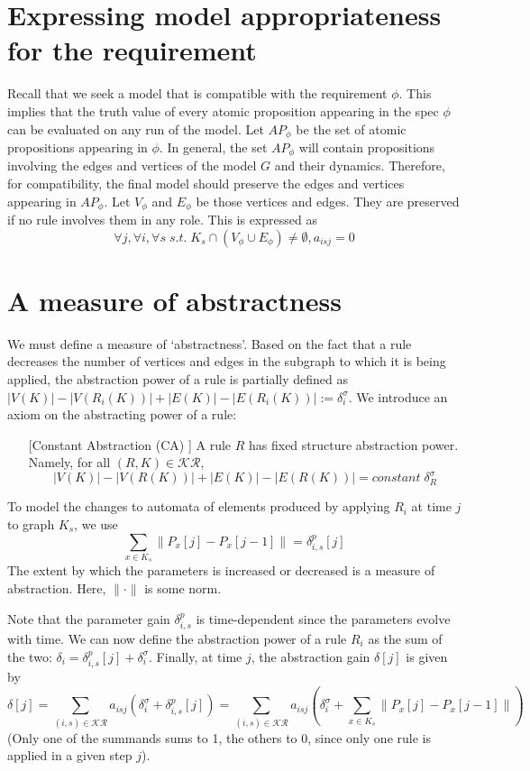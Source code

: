 \documentclass[11pt, oneside, reqno]{article}
\newcommand{\Kc}{\mathcal{K}}
\newcommand{\Rc}{\mathcal{R}}
\newcommand{\KR}{\Kc\Rc}
\begin{document}
\section{Expressing model appropriateness for the requirement}

Recall that we seek a model that is compatible with the requirement $\phi$.
This implies that the truth value of every atomic proposition appearing in the spec $\phi$ can be evaluated on any run of the model.
Let $AP_\phi$ be the set of atomic propositions appearing in $\phi$.
In general, the set $AP_\phi$ will contain propositions involving the edges and vertices of the model $G$ and their dynamics. 
Therefore, for compatibility, the final model should preserve the edges and vertices appearing in $AP_\phi$. 
Let $V_\phi$ and $E_\phi$ be those vertices and edges.
They are preserved if no rule involves them in any role.
This is expressed as
\begin{equation}
\label{eq:Vphi}
\forall j, \forall i, \forall s \; s.t. \; K_s \cap (V_\phi \cup E_\phi)\neq \emptyset, a_{isj}=0
\end{equation}


\section{A measure of abstractness}
We must define a measure of `abstractness'.
Based on the fact that a rule decreases the number of vertices and edges in the subgraph to which it is being applied, the abstraction power of a rule is partially defined as $|V(K)| - |V(R_i(K))| + |E(K)| - |E(R_i(K))| := \delta_{i}^{\sigma}$.
We introduce an axiom on the abstracting power of a rule:
\begin{enumerate}
	\item [[Constant Abstraction (CA)]] A rule $R$ has fixed structure abstraction power.
	Namely, for all $(R,K) \in \KR$, 
	\[|V(K)| - |V(R(K))| + |E(K)| - |E(R(K))| = constant \; \delta_{R}^{\sigma}\]
\end{enumerate}

To model the changes to automata of elements produced by applying $R_i$ at time $j$ to graph $K_s$, we use 
\[\sum_{x \in K_s}\|P_x[j]-P_x[j-1]\| = \delta_{i,s}^p[j]\]
The extent by which the parameters is increased or decreased is a measure of abstraction. 
Here, $\|\cdot\|$ is some norm.


Note that the parameter gain $\delta_{i,s}^p$ is time-dependent since the parameters evolve with time.
We can now define the abstraction power of a rule $R_i$ as the sum of the two: $\delta_{i}=  \delta_{i,s}^{p}[j]+\delta_{i}^{\sigma}$.
Finally, at time $j$, the abstraction gain $\delta[j]$ is given by
\begin{equation}
\delta[j] = \sum_{(i,s) \in \KR}a_{isj}(\delta_{i}^{\sigma} + \delta_{i,s}^p[j]) = \sum_{(i,s) \in \KR}a_{isj}(\delta_{i}^{\sigma} + \sum_{x \in K_s}\|P_x[j]-P_x[j-1]\|)
\end{equation}
(Only one of the summands sums to 1, the others to 0, since only one rule is applied in a given step $j$).
\end{document}
